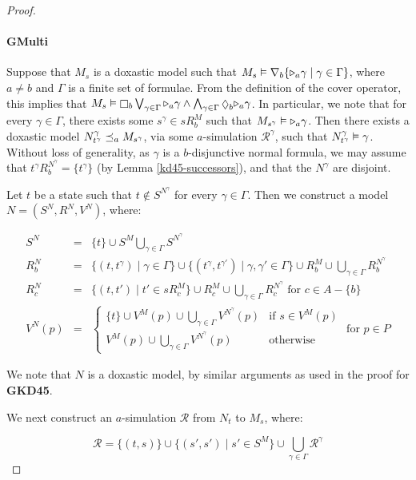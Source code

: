 \begin{proof}
\paragraph{GMulti} Suppose that $M_s$ is a doxastic model such that $M_s
\vDash \nabla_b \{ {\mathopen{\triangleright}}_a \gamma \mid \gamma \in \Gamma\}$, where $a \ne
b$ and $\Gamma$ is a finite set of formulae. From the definition of the cover
operator, this implies that $M_s \entails \knows_b \bigvee_{\gamma \in \Gamma}
\somerefs_a \gamma \land \bigwedge_{\gamma \in \Gamma} \suspects_b \somerefs_a
\gamma$. In particular, we note that for every $\gamma \in \Gamma$, there exists
some $s^\gamma \in sR^M_b$ such that $M_{s^\gamma} \vDash {\ensuremath{\mathopen{\triangleright}}}_a \gamma$.
Then there exists a doxastic model $N^\gamma_{t^\gamma} \preceq_a
M_{s^\gamma}$, via some $a$-simulation $\mathcal{R}^\gamma$, such that
$N^\gamma_{t^\gamma} \vDash \gamma$. Without loss of generality, as $\gamma$
is a $b$-disjunctive normal formula, we may assume that $t^\gamma R^{N^\gamma}_b
= \{t^\gamma\}$ (by Lemma \ref{kd45-successors}), and that the $N^\gamma$ are
disjoint.

Let $t$ be a state such that $t \notin S^{N^\gamma}$ for every $\gamma \in
\Gamma$. Then we construct a model $N = (S^N, R^N, V^N)$, where:

\begin{eqnarray*}
S^N &=& \{t\} \cup S^M \bigcup_{\gamma \in \Gamma} S^{N^\gamma}\\
R^N_b &=& \{(t, t^\gamma) \mid \gamma \in \Gamma\} \cup \{(t^\gamma,
t^{\gamma'}) \mid \gamma, \gamma' \in \Gamma\} \cup R^M_b \cup \bigcup_{\gamma
\in \Gamma} R^{N^\gamma}_b\\
R^N_c &=& \{(t, t') \mid t' \in sR^M_c\} \cup R^M_c \cup \bigcup_{\gamma \in
\Gamma} R^{N^\gamma}_c \text{ for $c \in A - \{b\}$}\\
V^N(p) &=& 
\begin{cases}
\{t\} \cup V^M(p) \cup \bigcup_{\gamma \in \Gamma} V^{N^\gamma}(p) & \text{if $s
\in V^M(p)$}\\
V^M(p) \cup \bigcup_{\gamma \in \Gamma} V^{N^\gamma}(p) & \text{otherwise}
\end{cases}
\text{ for $p \in P$}
\end{eqnarray*}

We note that $N$ is a doxastic model, by similar arguments as used in the proof
for {\bf GKD45}.

We next construct an $a$-simulation $\mathcal{R}$ from $N_t$ to $M_s$, where:

$$\mathcal{R} = \{(t, s)\} \cup \{(s', s') \mid s' \in S^M\} \cup \bigcup_{\gamma \in \Gamma} \mathcal{R}^\gamma$$


\end{proof}

